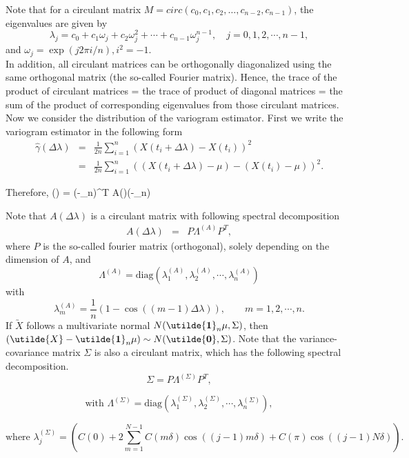 Note that for a circulant matrix $M = circ(c_0, c_{1}, c_{2}, \ldots, c_{n-2}, c_{n-1})$, the eigenvalues are given by
\[
\lambda_j = c_0 + c_1\omega_j + c_2 \omega_j^2 + \cdots + c_{n-1} \omega_j^{n-1}, \quad j = 0, 1, 2, \cdots, n-1,
\]
and $\omega_j = \exp(j2\pi i/n), i^2 = -1$. \\

In addition, all circulant matrices can be orthogonally diagonalized using the same orthogonal matrix (the so-called Fourier matrix). Hence,
the trace of the product of circulant matrices = the trace of product of diagonal matrices = the sum of the product of corresponding eigenvalues from those circulant matrices. \\


Now we consider the distribution of the variogram estimator. First we write the variogram estimator in the following form
\begin{eqnarray*}
\hat{\gamma}(\Delta \lambda) &=& \frac{1}{2n} \sum_{i=1}^n (X(t_i + \Delta \lambda) - X(t_i))^2  \\
&=& \frac{1}{2n} \sum_{i=1}^n ((X(t_i + \Delta \lambda)-\mu) - (X(t_i)-\mu))^2.
\end{eqnarray*}

Therefore,
\beq
\hat{\gamma}(\Delta \lambda) = (-_n\mu)^T A(\Delta \lambda)(-_n\mu)
\eeq

Note that $A(\Delta \lambda)$ is a circulant matrix with following spectral decomposition
\begin{eqnarray*}
A(\Delta \lambda) &=& P \Lambda^{(A)}P^T,
\end{eqnarray*}
where $P$ is the so-called fourier matrix (orthogonal), solely depending on the dimension of $A$, and
\[
\Lambda^{(A)} = \mbox{diag}(\lambda_1^{(A)}, \lambda_2^{(A)}, \cdots, \lambda_n^{(A)})
\]
with
\[
\lambda_m^{(A)} = \frac{1}{n}(1 - \cos((m-1)\Delta \lambda)), \quad \quad m = 1, 2, \cdots, n.
\]
If $\utilde{X}$ follows a multivariate normal $N(\utilde{\bf 1}_n\mu, \Sigma)$, then $(\utilde{X}-\utilde{\bf 1}_n\mu) \sim N(\utilde{\bf 0}, \Sigma)$. Note that
the variance-covariance matrix $\Sigma$ is also a circulant matrix, which has the following spectral decomposition.
\[
\Sigma = P \Lambda^{(\Sigma)} P^T,
\]

\[
\mbox{with }\Lambda^{(\Sigma)} = \mbox{diag}(\lambda_1^{(\Sigma)}, \lambda_2^{(\Sigma)}, \cdots, \lambda_n^{(\Sigma)}),
\]

\[
\mbox{where } \lambda_j^{(\Sigma)} = \left(C(0) + 2\sum_{m = 1}^{N-1}C(m\delta)\cos((j-1)m\delta) + C(\pi)\cos((j-1)N\delta)\right).
\]

